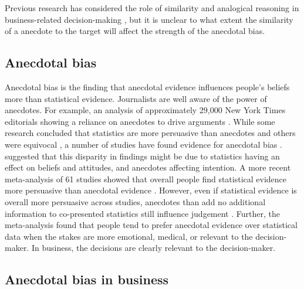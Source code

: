 \documentclass[a4paper, nobind, dvipsnames]{templates/ociamthesis}
\theoremstyle{definition}
\theoremstyle{definition}
\theoremstyle{definition}
\theoremstyle{definition}
\theoremstyle{remark}
\begin{document}
Previous research has considered the role of similarity and analogical reasoning
in business-related decision-making \autocite{gavetti2005}, but it is unclear to what
extent the similarity of a anecdote to the target will affect the strength of
the anecdotal bias.

\subsection{Anecdotal bias}

Anecdotal bias is the finding that anecdotal evidence influences people's
beliefs more than statistical evidence. Journalists are well aware of the power
of anecdotes. For example, an analysis of approximately 29,000 New York Times
editorials showing a reliance on anecdotes to drive arguments \autocite{alkhatib2017}.
While some research concluded that statistics are more persuasive than anecdotes
\autocites[e.g.,][]{allen1997,hornikx2005,hoeken2001} and others were equivocal
\autocite{winterbottom2008}, a number of studies have found evidence for anecdotal bias
\autocites[e.g.,][]{reinard1988,shen2015,jaramillo2019,ratcliff2020,reinhart2006}.
\textcite{zebregs2015} suggested that this disparity in findings might be due to
statistics having an effect on beliefs and attitudes, and anecdotes affecting
intention. A more recent meta-analysis of 61 studies showed that overall people
find statistical evidence more persuasive than anecdotal evidence
\autocite{freling2020}. However, even if statistical evidence is overall more persuasive
across studies, anecdotes than add no additional information to co-presented
statistics still influence judgement \autocite{jaramillo2019}. Further, the
meta-analysis found that people tend to prefer anecdotal evidence over
statistical data when the stakes are more emotional, medical, or relevant to the
decision-maker. In business, the decisions are clearly relevant to the
decision-maker.

\subsection{Anecdotal bias in business}
\end{document}
